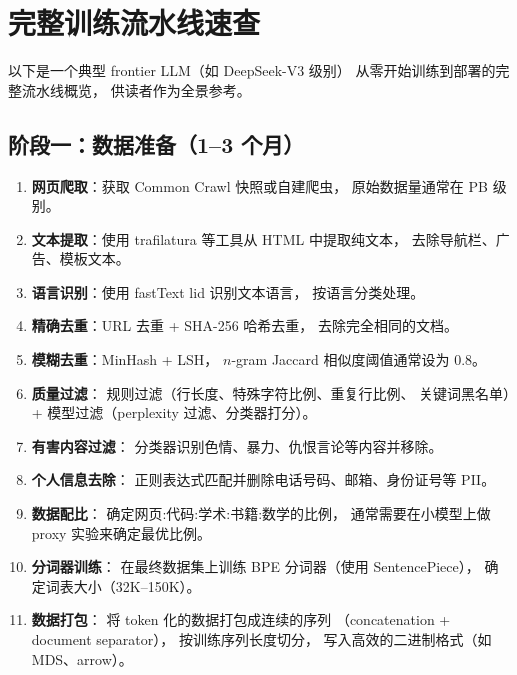 \chapter{完整训练流水线速查}
\label{app:pipeline}

以下是一个典型 frontier LLM（如 DeepSeek-V3 级别）
从零开始训练到部署的完整流水线概览，
供读者作为全景参考。

\section{阶段一：数据准备（1--3 个月）}

\begin{enumerate}[noitemsep]
  \item \textbf{网页爬取}：获取 Common Crawl 快照或自建爬虫，
        原始数据量通常在 PB 级别。
  \item \textbf{文本提取}：使用 trafilatura 等工具从 HTML 中提取纯文本，
        去除导航栏、广告、模板文本。
  \item \textbf{语言识别}：使用 fastText lid 识别文本语言，
        按语言分类处理。
  \item \textbf{精确去重}：URL 去重 + SHA-256 哈希去重，
        去除完全相同的文档。
  \item \textbf{模糊去重}：MinHash + LSH，
        $n$-gram Jaccard 相似度阈值通常设为 0.8。
  \item \textbf{质量过滤}：
        规则过滤（行长度、特殊字符比例、重复行比例、
        关键词黑名单）+
        模型过滤（perplexity 过滤、分类器打分）。
  \item \textbf{有害内容过滤}：
        分类器识别色情、暴力、仇恨言论等内容并移除。
  \item \textbf{个人信息去除}：
        正则表达式匹配并删除电话号码、邮箱、身份证号等 PII。
  \item \textbf{数据配比}：
        确定网页:代码:学术:书籍:数学的比例，
        通常需要在小模型上做 proxy 实验来确定最优比例。
  \item \textbf{分词器训练}：
        在最终数据集上训练 BPE 分词器（使用 SentencePiece），
        确定词表大小（32K--150K）。
  \item \textbf{数据打包}：
        将 token 化的数据打包成连续的序列
        （concatenation + document separator），
        按训练序列长度切分，
        写入高效的二进制格式（如 MDS、arrow）。
\end{enumerate}

